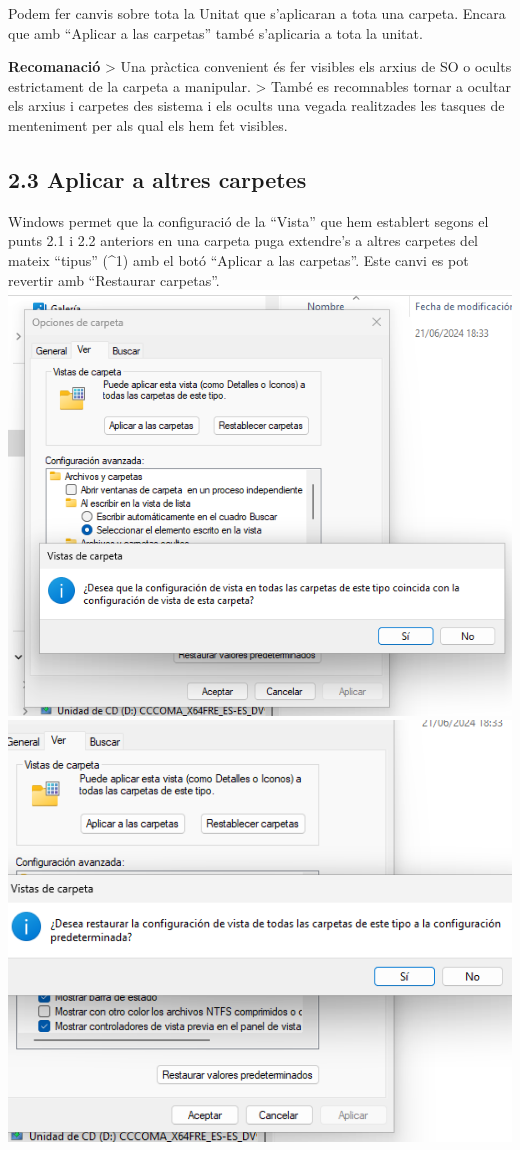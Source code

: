 \documentclass[
  a4paper,
]{article}
\begin{document}
Podem fer canvis sobre tota la Unitat que s'aplicaran a tota una
carpeta. Encara que amb ``Aplicar a las carpetas'' també s'aplicaria a
tota la unitat.

\textbf{Recomanació} \textgreater{} Una pràctica convenient és fer
visibles els arxius de SO o ocults estrictament de la carpeta a
manipular. \textgreater{} També es recomnables tornar a ocultar els
arxius i carpetes des sistema i els ocults una vegada realitzades les
tasques de menteniment per als qual els hem fet visibles.

\subsection{2.3 Aplicar a altres
carpetes}\label{aplicar-a-altres-carpetes}

Windows permet que la configuració de la ``Vista'' que hem establert
segons el punts 2.1 i 2.2 anteriors en una carpeta puga extendre's a
altres carpetes del mateix ``tipus'' (\^{}1) amb el botó ``Aplicar a las
carpetas''. Este canvi es pot revertir amb ``Restaurar carpetas''.
\includegraphics{png/aplicaralasCarpetas.png}
\includegraphics{png/restaurarCarpetas.png}
\end{document}
